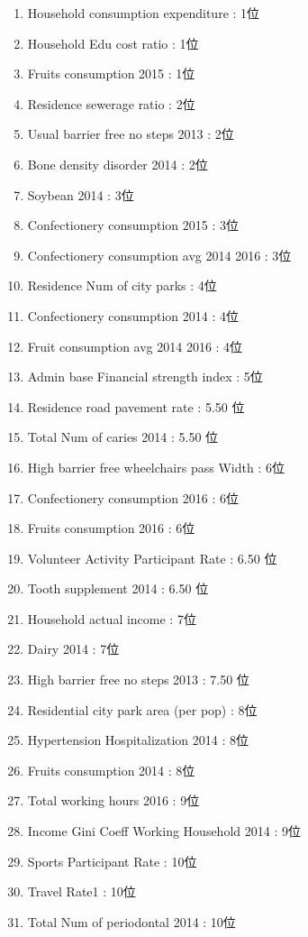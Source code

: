 \begin{multicols}{2}
\begin{enumerate}
	\item Household consumption expenditure : 1位
	\item Household Edu cost ratio : 1位
	\item Fruits consumption 2015 : 1位
	\item Residence sewerage ratio : 2位
	\item Usual barrier free no steps 2013 : 2位
	\item Bone density disorder 2014 : 2位
	\item Soybean 2014 : 3位
	\item Confectionery consumption 2015 : 3位
	\item Confectionery consumption avg 2014 2016 : 3位
	\item Residence Num of city parks : 4位
	\item Confectionery consumption 2014 : 4位
	\item Fruit consumption avg 2014 2016 : 4位
	\item Admin base Financial strength index : 5位
	\item Residence road pavement rate : 5.50 位
	\item Total Num of caries 2014 : 5.50 位
	\item High barrier free wheelchairs pass Width : 6位
	\item Confectionery consumption 2016 : 6位
	\item Fruits consumption 2016 : 6位
	\item Volunteer Activity Participant Rate : 6.50 位
	\item Tooth supplement 2014 : 6.50 位
	\item Household actual income : 7位
	\item Dairy 2014 : 7位
	\item High barrier free no steps 2013 : 7.50 位
	\item Residential city park area (per pop) : 8位
	\item Hypertension Hospitalization 2014 : 8位
	\item Fruits consumption 2014 : 8位
	\item Total working hours 2016 : 9位
	\item Income Gini Coeff Working Household 2014 : 9位
	\item Sports Participant Rate : 10位
	\item Travel Rate1 : 10位
	\item Total Num of periodontal 2014 : 10位

\end{enumerate}
\end{multicols}
